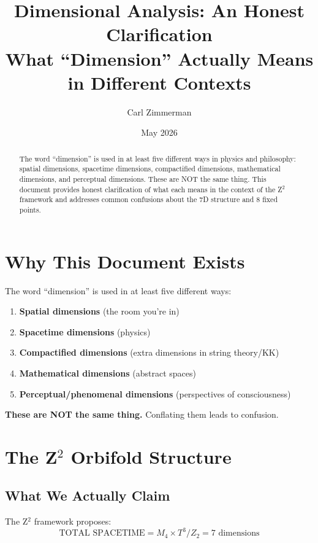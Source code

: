 \documentclass[12pt,a4paper]{article}
\title{\textbf{Dimensional Analysis: An Honest Clarification}\\[0.5em]
\large What ``Dimension'' Actually Means in Different Contexts}
\author{Carl Zimmerman}
\date{May 2026}
\begin{document}
\maketitle

\begin{abstract}
The word ``dimension'' is used in at least five different ways in physics and philosophy: spatial dimensions, spacetime dimensions, compactified dimensions, mathematical dimensions, and perceptual dimensions. These are NOT the same thing. This document provides honest clarification of what each means in the context of the Z$^2$ framework and addresses common confusions about the 7D structure and 8 fixed points.
\end{abstract}

\tableofcontents
\newpage

\section{Why This Document Exists}

The word ``dimension'' is used in at least five different ways:
\begin{enumerate}
\item \textbf{Spatial dimensions} (the room you're in)
\item \textbf{Spacetime dimensions} (physics)
\item \textbf{Compactified dimensions} (extra dimensions in string theory/KK)
\item \textbf{Mathematical dimensions} (abstract spaces)
\item \textbf{Perceptual/phenomenal dimensions} (perspectives of consciousness)
\end{enumerate}

\textbf{These are NOT the same thing.} Conflating them leads to confusion.

\section{The Z$^2$ Orbifold Structure}

\subsection{What We Actually Claim}

The Z$^2$ framework proposes:
\begin{equation}
\text{TOTAL SPACETIME} = M_4 \times T^3/Z_2 = 7 \text{ dimensions}
\end{equation}
\end{document}
